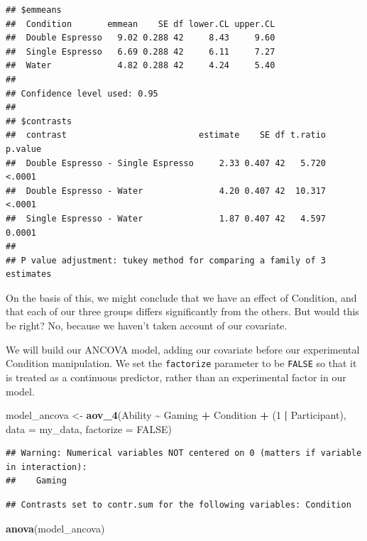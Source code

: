 \documentclass[
]{book}
\newenvironment{Shaded}{\begin{snugshade}}{\end{snugshade}}
\newcommand{\AttributeTok}[1]{\textcolor[rgb]{0.13,0.29,0.53}{#1}}
\newcommand{\ConstantTok}[1]{\textcolor[rgb]{0.56,0.35,0.01}{#1}}
\newcommand{\DecValTok}[1]{\textcolor[rgb]{0.00,0.00,0.81}{#1}}
\newcommand{\FunctionTok}[1]{\textcolor[rgb]{0.13,0.29,0.53}{\textbf{#1}}}
\newcommand{\NormalTok}[1]{#1}
\newcommand{\OtherTok}[1]{\textcolor[rgb]{0.56,0.35,0.01}{#1}}
\newcommand{\SpecialCharTok}[1]{\textcolor[rgb]{0.81,0.36,0.00}{\textbf{#1}}}
\begin{document}
\begin{verbatim}
## $emmeans
##  Condition       emmean    SE df lower.CL upper.CL
##  Double Espresso   9.02 0.288 42     8.43     9.60
##  Single Espresso   6.69 0.288 42     6.11     7.27
##  Water             4.82 0.288 42     4.24     5.40
## 
## Confidence level used: 0.95 
## 
## $contrasts
##  contrast                          estimate    SE df t.ratio p.value
##  Double Espresso - Single Espresso     2.33 0.407 42   5.720  <.0001
##  Double Espresso - Water               4.20 0.407 42  10.317  <.0001
##  Single Espresso - Water               1.87 0.407 42   4.597  0.0001
## 
## P value adjustment: tukey method for comparing a family of 3 estimates
\end{verbatim}

On the basis of this, we might conclude that we have an effect of Condition, and that each of our three groups differs significantly from the others. But would this be right? No, because we haven't taken account of our covariate.

We will build our ANCOVA model, adding our covariate before our experimental Condition manipulation. We set the \texttt{factorize} parameter to be \texttt{FALSE} so that it is treated as a continuous predictor, rather than an experimental factor in our model.

\begin{Shaded}
\begin{Highlighting}[]
\NormalTok{model\_ancova }\OtherTok{\textless{}{-}} \FunctionTok{aov\_4}\NormalTok{(Ability }\SpecialCharTok{\textasciitilde{}}\NormalTok{ Gaming }\SpecialCharTok{+}\NormalTok{ Condition }\SpecialCharTok{+}\NormalTok{ (}\DecValTok{1} \SpecialCharTok{|}\NormalTok{ Participant), }\AttributeTok{data =}\NormalTok{ my\_data, }\AttributeTok{factorize =} \ConstantTok{FALSE}\NormalTok{)}
\end{Highlighting}
\end{Shaded}

\begin{verbatim}
## Warning: Numerical variables NOT centered on 0 (matters if variable in interaction):
##    Gaming
\end{verbatim}

\begin{verbatim}
## Contrasts set to contr.sum for the following variables: Condition
\end{verbatim}

\begin{Shaded}
\begin{Highlighting}[]
\FunctionTok{anova}\NormalTok{(model\_ancova)}
\end{Highlighting}
\end{Shaded}
\end{document}
